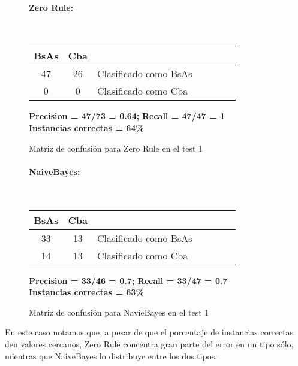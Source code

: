 \begin{figure}[H]
	\centering
	\paragraph*{Zero Rule:}\mbox{}\\
	\begin{table}[H]
		\centering
		\begin{tabular}{|c|c|l|c|c|c|c|}
			\hline
			BsAs & Cba &  \\ \hline
			47 &  26 &  Clasificado como BsAs \\ \hline
			0 &  0 &  Clasificado como Cba \\ \hline
		\end{tabular}
	\end{table}
	\begin{center}
		\textbf{Precision = 47/73 = 0.64;} \textbf{Recall = 47/47 = 1}\\
		\textbf{Instancias correctas = 64\%}
	\end{center}
	\caption{Matriz de confusión para Zero Rule en el test 1}
	\label{ZeroR_matrizconf_2}
\end{figure}

\begin{figure}[H]
	\centering
	\paragraph*{NaiveBayes:}\mbox{}\\
	\begin{table}[H]
		\centering
		\begin{tabular}{|c|c|l|c|c|c|c|}
			\hline
			BsAs & Cba &  \\ \hline
			33 &  13 &  Clasificado como BsAs \\ \hline
			14 &  13 &  Clasificado como Cba \\ \hline
		\end{tabular}
	\end{table}
	\begin{center}
		\textbf{Precision = 33/46 = 0.7;} \textbf{Recall = 33/47 = 0.7}\\
		\textbf{Instancias correctas = 63\%}
	\end{center}
	\caption{Matriz de confusión para NavieBayes en el test 1}
	\label{NaiveBayes_matrizconf_2}
\end{figure}

En este caso notamos que, a pesar de que el porcentaje de instancias correctas den valores cercanos, Zero Rule concentra gran parte del error en un tipo sólo, mientras que NaiveBayes lo distribuye entre los dos tipos.

